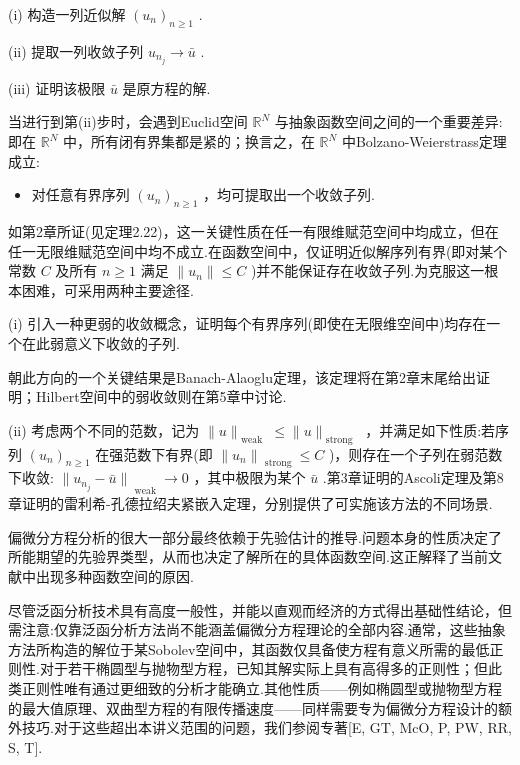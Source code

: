 (i) 构造一列近似解 ${\left( {u}_{n}\right) }_{n \geq  1}$ .

(ii) 提取一列收敛子列 ${u}_{{n}_{j}} \rightarrow  \bar{u}$ .

(iii) 证明该极限 $\bar{u}$ 是原方程的解.

当进行到第(ii)步时，会遇到Euclid空间 ${\mathbb{R}}^{N}$ 与抽象函数空间之间的一个重要差异:即在 ${\mathbb{R}}^{N}$ 中，所有闭有界集都是紧的；换言之，在 ${\mathbb{R}}^{N}$ 中Bolzano-Weierstrass定理成立:

\begin{itemize}\relax
\item\relax 对任意有界序列 ${\left( {u}_{n}\right) }_{n \geq  1}$ ，均可提取出一个收敛子列.
\end{itemize}

如第2章所证(见定理2.22)，这一关键性质在任一有限维赋范空间中均成立，但在任一无限维赋范空间中均不成立.在函数空间中，仅证明近似解序列有界(即对某个常数 $C$ 及所有 $n \geq  1$ 满足 $\|{u}_{n}\| \leq  C$ )并不能保证存在收敛子列.为克服这一根本困难，可采用两种主要途径.

(i) 引入一种更弱的收敛概念，证明每个有界序列(即使在无限维空间中)均存在一个在此弱意义下收敛的子列.

朝此方向的一个关键结果是Banach-Alaoglu定理，该定理将在第2章末尾给出证明；Hilbert空间中的弱收敛则在第5章中讨论.

(ii) 考虑两个不同的范数，记为 $\| u{\| }_{\text{ weak }} \leq  \| u{\| }_{\text{ strong }}$ ，并满足如下性质:若序列 ${\left( {u}_{n}\right) }_{n \geq  1}$ 在强范数下有界(即 ${\|{u}_{n}\|}_{\text{ strong }} \leq  C$ )，则存在一个子列在弱范数下收敛: ${\|{u}_{{n}_{j}} - \bar{u}\|}_{\text{ weak }} \rightarrow  0$ ，其中极限为某个 $\bar{u}$ .第3章证明的Ascoli定理及第8章证明的雷利希-孔德拉绍夫紧嵌入定理，分别提供了可实施该方法的不同场景.

偏微分方程分析的很大一部分最终依赖于先验估计的推导.问题本身的性质决定了所能期望的先验界类型，从而也决定了解所在的具体函数空间.这正解释了当前文献中出现多种函数空间的原因.

尽管泛函分析技术具有高度一般性，并能以直观而经济的方式得出基础性结论，但需注意:仅靠泛函分析方法尚不能涵盖偏微分方程理论的全部内容.通常，这些抽象方法所构造的解位于某Sobolev空间中，其函数仅具备使方程有意义所需的最低正则性.对于若干椭圆型与抛物型方程，已知其解实际上具有高得多的正则性；但此类正则性唯有通过更细致的分析才能确立.其他性质——例如椭圆型或抛物型方程的最大值原理、双曲型方程的有限传播速度——同样需要专为偏微分方程设计的额外技巧.对于这些超出本讲义范围的问题，我们参阅专著[E, GT, McO, P, PW, RR, S, T].

